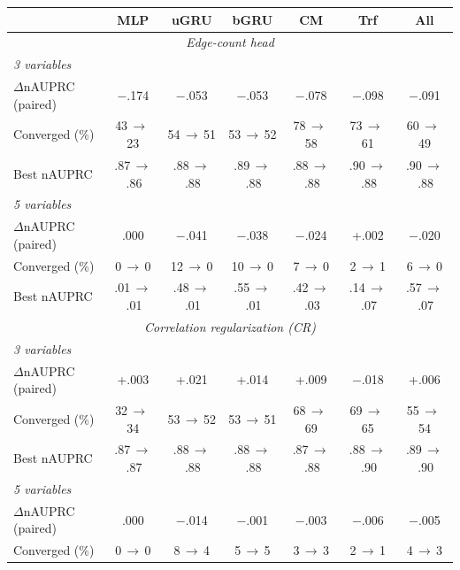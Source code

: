 \begin{table}[ht]
    \centering
    \small
    \setlength{\tabcolsep}{3pt}
    \begin{tabular}{lccccc|c}
    \toprule
        ~ & \textbf{MLP} & \textbf{uGRU} & \textbf{bGRU} & \textbf{CM} & \textbf{Trf} & \textbf{All} \\
    \midrule
        \multicolumn{7}{c}{\textit{Edge-count head}} \\
    \midrule
        \textit{3 variables} & \multicolumn{6}{c}{} \\
        \quad $\Delta$nAUPRC (paired) & $-$.174 & $-$.053 & $-$.053 & $-$.078 & $-$.098 & $-$.091 \\
        \quad Converged (\%) & 43\,$\to$\,23 & 54\,$\to$\,51 & 53\,$\to$\,52 & 78\,$\to$\,58 & 73\,$\to$\,61 & 60\,$\to$\,49 \\
        \quad Best nAUPRC & .87\,$\to$\,.86 & .88\,$\to$\,.88 & .89\,$\to$\,.88 & .88\,$\to$\,.88 & .90\,$\to$\,.88 & .90\,$\to$\,.88 \\
        \textit{5 variables} & \multicolumn{6}{c}{} \\
        \quad $\Delta$nAUPRC (paired) & .000 & $-$.041 & $-$.038 & $-$.024 & +.002 & $-$.020 \\
        \quad Converged (\%) & 0\,$\to$\,0 & 12\,$\to$\,0 & 10\,$\to$\,0 & 7\,$\to$\,0 & 2\,$\to$\,1 & 6\,$\to$\,0 \\
        \quad Best nAUPRC & .01\,$\to$\,.01 & .48\,$\to$\,.01 & .55\,$\to$\,.01 & .42\,$\to$\,.03 & .14\,$\to$\,.07 & .57\,$\to$\,.07 \\
    \midrule
        \multicolumn{7}{c}{\textit{Correlation regularization (CR)}} \\
    \midrule
        \textit{3 variables} & \multicolumn{6}{c}{} \\
        \quad $\Delta$nAUPRC (paired) & +.003 & +.021 & +.014 & +.009 & $-$.018 & +.006 \\
        \quad Converged (\%) & 32\,$\to$\,34 & 53\,$\to$\,52 & 53\,$\to$\,51 & 68\,$\to$\,69 & 69\,$\to$\,65 & 55\,$\to$\,54 \\
        \quad Best nAUPRC & .87\,$\to$\,.87 & .88\,$\to$\,.88 & .88\,$\to$\,.88 & .87\,$\to$\,.88 & .88\,$\to$\,.90 & .89\,$\to$\,.90 \\
        \textit{5 variables} & \multicolumn{6}{c}{} \\
        \quad $\Delta$nAUPRC (paired) & .000 & $-$.014 & $-$.001 & $-$.003 & $-$.006 & $-$.005 \\
        \quad Converged (\%) & 0\,$\to$\,0 & 8\,$\to$\,4 & 5\,$\to$\,5 & 3\,$\to$\,3 & 2\,$\to$\,1 & 4\,$\to$\,3 \\

\end{tabular}
\end{table}
